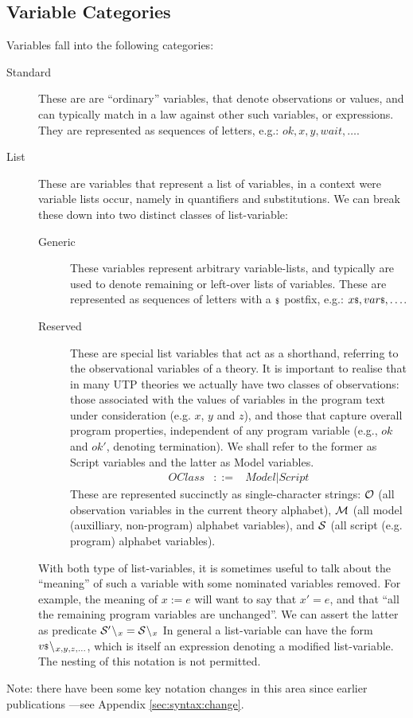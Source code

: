 \subsection{Variable Categories}

Variables fall into the following categories:
\begin{description}
  \item[Standard]
    These are are ``ordinary'' variables, that denote observations or values,
    and can typically match in a law against other such variables, or expressions.
    They are represented as sequences of letters, e.g.: $ok, x, y, wait, \ldots$.
  \item[List]
    These are variables that represent a list of variables, in a context were
    variable lists occur, namely in quantifiers and substitutions.
    We can break these down into two distinct classes of list-variable:
    \begin{description}
      \item[Generic]
        These variables represent arbitrary variable-lists,
        and typically are used to denote remaining or left-over lists of variables.
        These are represented as sequences of letters with a ${}{\scriptstyle\$}$ postfix,
        e.g.: ${x}{\scriptstyle\$}, {var}{\scriptstyle\$}, \ldots$.
      \item[Reserved]
        These are special list variables that act as a shorthand, referring
        to the observational variables of a theory.
        It is important to realise that in many UTP theories
        we actually have two classes of observations: those associated with
        the values of variables in the program text under consideration (e.g. $x$, $y$ and $z$),
        and those that capture overall program properties, independent of any program variable
        (e.g., $ok$ and $ok'$, denoting termination).
        We shall refer to the former as Script variables and the latter as Model variables.
        \begin{eqnarray*}
           OClass &::=& Model | Script
        \end{eqnarray*}
        These are represented succinctly as single-character strings: $\mathcal O$
        (all observation variables in the current theory alphabet),
        $\mathcal M$ (all model (auxilliary, non-program) alphabet variables),
        and $\mathcal S$ (all script (e.g. program) alphabet variables).
    \end{description}
    With both type of list-variables, it is sometimes useful to talk about
    the ``meaning'' of such a variable with some nominated variables removed.
    For example, the meaning of $x:=e$ will want to say that $x'=e$,
    and that ``all the remaining program variables are unchanged''.
    We can assert the latter as predicate $\mathcal S'{}\!\setminus\!{}_{x} = \mathcal S{}\!\setminus\!{}_{x}$
    In general a list-variable can have the form ${v}{\scriptstyle\$}{}\!\setminus\!{}_{x,y,z,\ldots}$,
    which is itself an expression denoting a modified list-variable.
    The nesting of this notation is not permitted.
\end{description}
Note: there have been some key notation changes in this area
since earlier publications
---see Appendix \ref{sec:syntax:change}.

